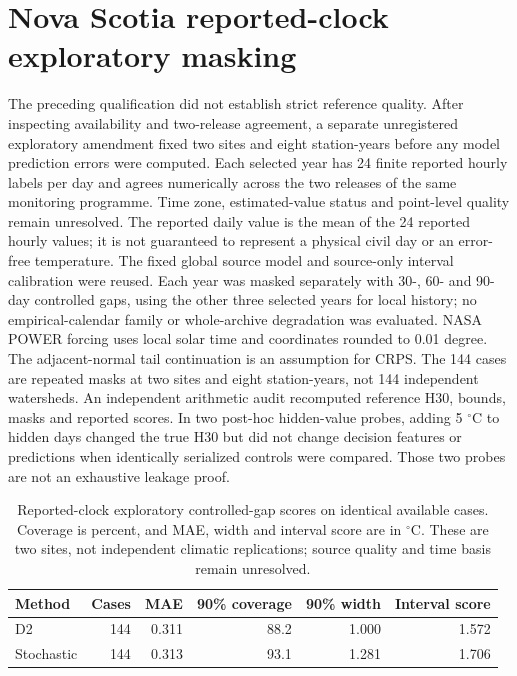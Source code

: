 \section{Nova Scotia reported-clock exploratory masking}
The preceding qualification did not establish strict reference quality. After inspecting availability and two-release agreement, a separate unregistered exploratory amendment fixed two sites and eight station-years before any model prediction errors were computed. Each selected year has 24 finite reported hourly labels per day and agrees numerically across the two releases of the same monitoring programme. Time zone, estimated-value status and point-level quality remain unresolved. The reported daily value is the mean of the 24 reported hourly values; it is not guaranteed to represent a physical civil day or an error-free temperature. The fixed global source model and source-only interval calibration were reused. Each year was masked separately with 30-, 60- and 90-day controlled gaps, using the other three selected years for local history; no empirical-calendar family or whole-archive degradation was evaluated. NASA POWER forcing uses local solar time and coordinates rounded to 0.01 degree. The adjacent-normal tail continuation is an assumption for CRPS. The 144 cases are repeated masks at two sites and eight station-years, not 144 independent watersheds. An independent arithmetic audit recomputed reference H30, bounds, masks and reported scores. In two post-hoc hidden-value probes, adding 5 $^{\circ}$C to hidden days changed the true H30 but did not change decision features or predictions when identically serialized controls were compared. Those two probes are not an exhaustive leakage proof.
\begin{table}[p]\centering\small
\caption{Reported-clock exploratory controlled-gap scores on identical available cases. Coverage is percent, and MAE, width and interval score are in $^{\circ}$C. These are two sites, not independent climatic replications; source quality and time basis remain unresolved.}\label{tab:ns-exploratory}
\begin{tabular}{lrrrrr}\toprule
Method & Cases & MAE & 90\% coverage & 90\% width & Interval score\\\midrule
D2 & 144 & 0.311 & 88.2 & 1.000 & 1.572\\
Stochastic & 144 & 0.313 & 93.1 & 1.281 & 1.706\\
\bottomrule\end{tabular}
\end{table}
